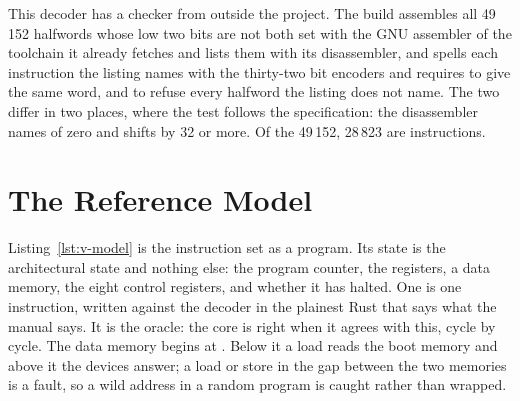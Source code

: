 \documentclass[journal,onecolumn,9pt]{IEEEtran}
\begin{document}
This decoder has a checker from outside the project. The build
assembles all 49\,152 halfwords whose low two bits are not both set
with the GNU assembler of the toolchain it already fetches and lists
them with its disassembler, and 
spells each instruction the listing names with the thirty-two bit
encoders and requires  to give the same word, and
to refuse every halfword the listing does not name. The two differ in
two places, where the test follows the specification: the
disassembler names  of zero and shifts by 32 or more.
Of the 49\,152, 28\,823 are instructions.



\section{The Reference Model}
\label{sec:v-model}

Listing~\ref{lst:v-model} is the instruction set as a program. Its
state is the architectural state and nothing else: the program
counter, the registers, a data memory, the eight control registers,
and whether it has halted. One  is one instruction,
written against the decoder in the plainest Rust that says what the
manual says. It is the oracle: the core is right when it agrees with
this, cycle by cycle. The data memory begins at .
Below it a load reads the boot memory and above it the devices
answer; a load or store in the gap between the two memories is a
fault, so a wild address in a random program is caught rather than
wrapped.
\end{document}
